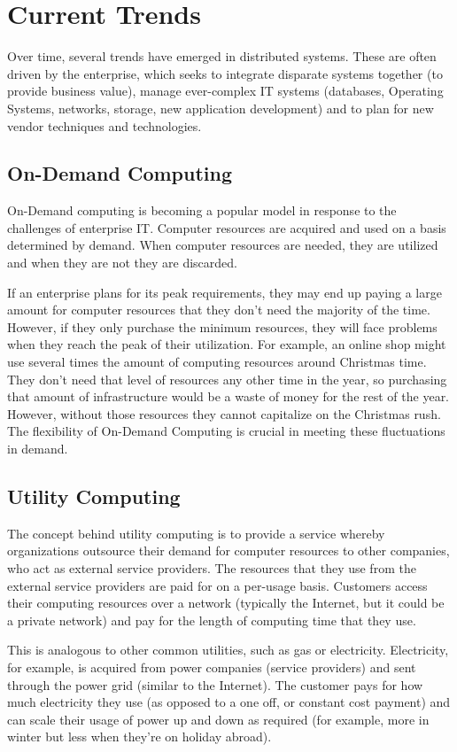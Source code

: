 \documentclass{article}
\begin{document}
\section{Current Trends}
Over time, several trends have emerged in distributed systems. These are often driven by the enterprise, which seeks to integrate disparate systems together (to provide business value), manage ever-complex IT systems (databases, Operating Systems, networks, storage, new application development) and to plan for new vendor techniques and technologies.

\subsection{On-Demand Computing}
On-Demand computing is becoming a popular model in response to the challenges of enterprise IT. Computer resources are acquired and used on a basis determined by demand. When computer resources are needed, they are utilized and when they are not they are discarded. 

If an enterprise plans for its peak requirements, they may end up paying a large amount for computer resources that they don't need the majority of the time. However, if they only purchase the minimum resources, they will face problems when they reach the peak of their utilization. For example, an online shop might use several times the amount of computing resources around Christmas time. They don't need that level of resources any other time in the year, so purchasing that amount of infrastructure would be a waste of money for the rest of the year. However, without those resources they cannot capitalize on the Christmas rush. The flexibility of On-Demand Computing is crucial in meeting these fluctuations in demand.

\subsection{Utility Computing}
The concept behind utility computing is to provide a service whereby organizations outsource their demand for computer resources to other companies, who act as external service providers. The resources that they use from the external service providers are paid for on a per-usage basis. Customers access their computing resources over a network (typically the Internet, but it could be a private network) and pay for the length of computing time that they use. 

This is analogous to other common utilities, such as gas or electricity. Electricity, for example, is acquired from power companies (service providers) and sent through the power grid (similar to the Internet). The customer pays for how much electricity they use (as opposed to a one off, or constant cost payment) and can scale their usage of power up and down as required (for example, more in winter but less when they're on holiday abroad).
\end{document}
